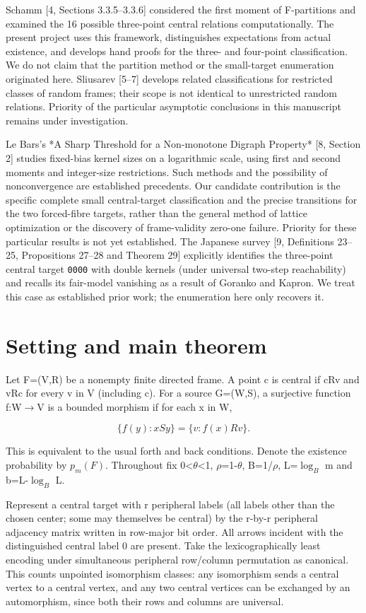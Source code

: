 \documentclass[11pt]{article}
\begin{document}
Schamm [4, Sections 3.3.5--3.3.6] considered the first moment of F-partitions and examined the 16 possible three-point central relations computationally. The present project uses this framework, distinguishes expectations from actual existence, and develops hand proofs for the three- and four-point classification. We do not claim that the partition method or the small-target enumeration originated here. Sliusarev [5--7] develops related classifications for restricted classes of random frames; their scope is not identical to unrestricted random relations. Priority of the particular asymptotic conclusions in this manuscript remains under investigation.

Le Bars's *A Sharp Threshold for a Non-monotone Digraph Property* [8, Section 2] studies fixed-bias kernel sizes on a logarithmic scale, using first and second moments and integer-size restrictions. Such methods and the possibility of nonconvergence are established precedents. Our candidate contribution is the specific complete small central-target classification and the precise transitions for the two forced-fibre targets, rather than the general method of lattice optimization or the discovery of frame-validity zero-one failure. Priority for these particular results is not yet established. The Japanese survey [9, Definitions 23--25, Propositions 27--28 and Theorem 29] explicitly identifies the three-point central target \texttt{0000} with double kernels (under universal two-step reachability) and recalls its fair-model vanishing as a result of Goranko and Kapron. We treat this case as established prior work; the enumeration here only recovers it.

\section{Setting and main theorem}

Let F=(V,R) be a nonempty finite directed frame. A point c is central if cRv and vRc for every v in V (including c). For a source G=(W,S), a surjective function f:W\ensuremath{\to}V is a bounded morphism if for each x in W,

\[
\{f(y):xSy\}=\{v:f(x)Rv\}.
\]

This is equivalent to the usual forth and back conditions. Denote the existence probability by $p_m(F)$. Throughout fix 0<$\theta$<1, $\rho$=1-$\theta$, B=1/$\rho$, L=$\log_B$ m and b=L-$\log_B$ L.

Represent a central target with r peripheral labels (all labels other than the chosen center; some may themselves be central) by the r-by-r peripheral adjacency matrix written in row-major bit order. All arrows incident with the distinguished central label 0 are present. Take the lexicographically least encoding under simultaneous peripheral row/column permutation as canonical. This counts unpointed isomorphism classes: any isomorphism sends a central vertex to a central vertex, and any two central vertices can be exchanged by an automorphism, since both their rows and columns are universal.
\end{document}
